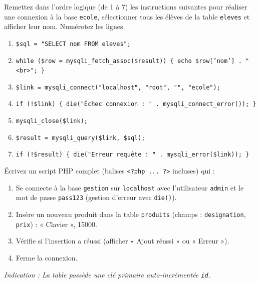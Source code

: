 \documentclass[11pt]{article}
\begin{document}
\begin{exercice}
Remettez dans l'ordre logique (de 1 à 7) les instructions suivantes pour réaliser une connexion à la base \texttt{ecole}, sélectionner tous les élèves de la table \texttt{eleves} et afficher leur nom. Numérotez les lignes.
\begin{enumerate}
    \item \texttt{\$sql = "SELECT nom FROM eleves";}
    \item \texttt{while (\$row = mysqli\_fetch\_assoc(\$result)) \{ echo \$row['nom'] . "<br>"; \}}
    \item \texttt{\$link = mysqli\_connect("localhost", "root", "", "ecole");}
    \item \texttt{if (!\$link) \{ die("Échec connexion : " . mysqli\_connect\_error()); \}}
    \item \texttt{mysqli\_close(\$link);}
    \item \texttt{\$result = mysqli\_query(\$link, \$sql);}
    \item \texttt{if (!\$result) \{ die("Erreur requête : " . mysqli\_error(\$link)); \}}
\end{enumerate}
\end{exercice}

\begin{exercice}
Écrivez un script PHP complet (balises \texttt{<?php ... ?>} incluses) qui :
\begin{enumerate}
    \item Se connecte à la base \texttt{gestion} sur \texttt{localhost} avec l'utilisateur \texttt{admin} et le mot de passe \texttt{pass123} (gestion d'erreur avec \texttt{die()}).
    \item Insère un nouveau produit dans la table \texttt{produits} (champs : \texttt{designation}, \texttt{prix}) : « Clavier », 15000.
    \item Vérifie si l'insertion a réussi (afficher « Ajout réussi » ou « Erreur »).
    \item Ferme la connexion.
\end{enumerate}
\textit{Indication : La table possède une clé primaire auto-incrémentée \texttt{id}.}
\end{exercice}
\end{document}

